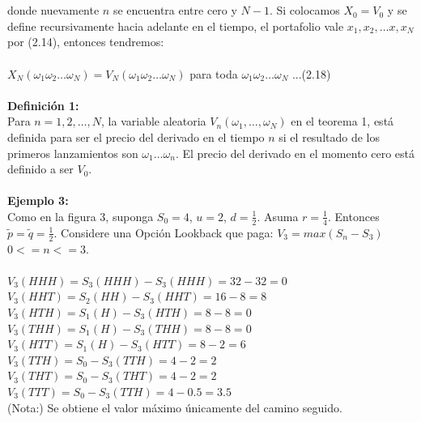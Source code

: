 \documentclass{article}
\begin{document}
        \\
        \\
        donde nuevamente \(n\) se encuentra entre cero y \(N-1\). Si colocamos \(X_0 = V_0\) y se define recursivamente hacia adelante en el tiempo, el portafolio vale \(x_1, x_2, \dots x, x_N\) por (2.14), entonces tendremos:
        \\
        \\
        \(X_N(\omega_1 \omega_2 \dots \omega_N) = V_N(\omega_1 \omega_2 \dots \omega_N)\) para toda \(\omega_1 \omega_2 \dots \omega_N\) ...(2.18)
        \\
        \\
        \textbf{Definición 1:}
        \\
        Para \(n=1,2,\dots,N\), la variable aleatoria \(V_n(\omega_1,\dots, \omega_N)\) en el teorema 1, está definida para ser el precio del derivado en el tiempo \(n\) si el resultado de los primeros lanzamientos son \(\omega_1 \dots \omega_n\). El precio del derivado en el momento cero está definido a ser \(V_0\).
        \\
        \\
        \textbf{Ejemplo 3:}
        \\
        Como en la figura 3, suponga \(S_0 = 4\), \(u=2\), \(d=\frac{1}{2}\).
        Asuma \(r = \frac{1}{4}\). Entonces \(\tilde{p} = \tilde{q} = \frac{1}{2}\). Considere una Opción Lookback que paga: \(V_3 = max(S_n-S_3)\) \(0<=n<=3\).
        \\
        \\
        \(V_3(HHH) = S_3(HHH) - S_3(HHH) = 32-32 = 0\)
        \\
        \(V_3(HHT) = S_2(HH) - S_3(HHT) = 16-8 = 8\)
        \\
        \(V_3(HTH) = S_1(H) - S_3(HTH) = 8-8 = 0\)
        \\
        \(V_3(THH) = S_1(H) - S_3(THH) = 8-8 = 0\)
        \\
        \(V_3(HTT) = S_1(H) - S_3(HTT) = 8-2 = 6\)
        \\
        \(V_3(TTH) = S_0 - S_3(TTH) = 4-2 = 2\)
        \\
        \(V_3(THT) = S_0 - S_3(THT) = 4-2 = 2\)
        \\
        \(V_3(TTT) = S_0 - S_3(TTH) = 4-0.5 = 3.5\)
        \\
        (Nota:) Se obtiene el valor máximo únicamente del camino seguido.
\end{document}
